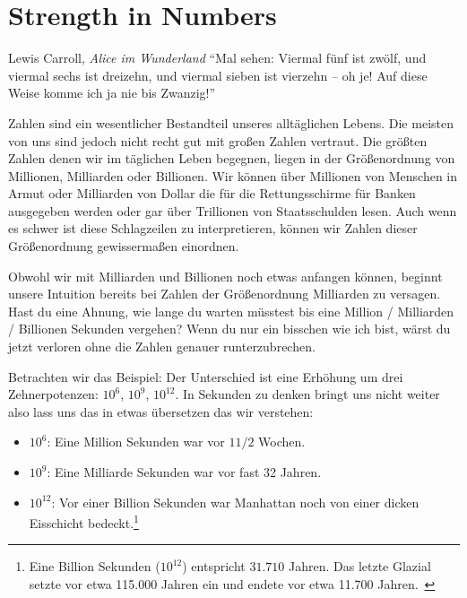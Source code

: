 \chapter{Strength in Numbers}
\label{les:15}

\begin{chapquote}{Lewis Carroll, \textit{Alice im Wunderland}}
\enquote{Mal sehen: Viermal fünf ist zwölf, und viermal sechs ist dreizehn, und
viermal sieben ist vierzehn – oh je! Auf diese Weise komme ich ja nie bis
Zwanzig!}
\end{chapquote}

Zahlen sind ein wesentlicher Bestandteil unseres alltäglichen Lebens. Die
meisten von uns sind jedoch nicht recht gut mit großen Zahlen vertraut. Die
größten Zahlen denen wir im täglichen Leben begegnen, liegen in der
Größenordnung von Millionen, Milliarden oder Billionen. Wir können über
Millionen von Menschen in Armut oder Milliarden von Dollar die für die
Rettungsschirme für Banken ausgegeben werden oder gar über Trillionen von
Staatsschulden lesen. Auch wenn es schwer ist diese Schlagzeilen zu
interpretieren, können wir Zahlen dieser Größenordnung gewissermaßen einordnen.

Obwohl wir mit Milliarden und Billionen noch etwas anfangen können, beginnt
unsere Intuition bereits bei Zahlen der Größenordnung Milliarden zu versagen.
Hast du eine Ahnung, wie lange du warten müsstest bis eine Million / Milliarden
/ Billionen Sekunden vergehen? Wenn du nur ein bisschen wie ich bist, wärst du
jetzt verloren ohne die Zahlen genauer runterzubrechen.

Betrachten wir das Beispiel: Der Unterschied ist eine Erhöhung um drei
Zehnerpotenzen: $10^6$, $10^9$, $10^{12}$. In Sekunden zu denken bringt uns
nicht weiter also lass uns das in etwas übersetzen das wir verstehen:

\begin{itemize}
  \item $10^6$: Eine Million Sekunden war vor $1 1/2$ Wochen.
  \item $10^9$: Eine Milliarde Sekunden war vor fast 32 Jahren.
  \item $10^{12}$: Vor einer Billion Sekunden war Manhattan noch von einer
  dicken Eisschicht bedeckt.\footnote{Eine Billion Sekunden ($10^{12}$)
  entspricht $31.710$ Jahren. Das letzte Glazial setzte vor etwa 115.000 Jahren
  ein und endete vor etwa 11.700 Jahren.~\cite{wiki:LGM}}
\end{itemize}


